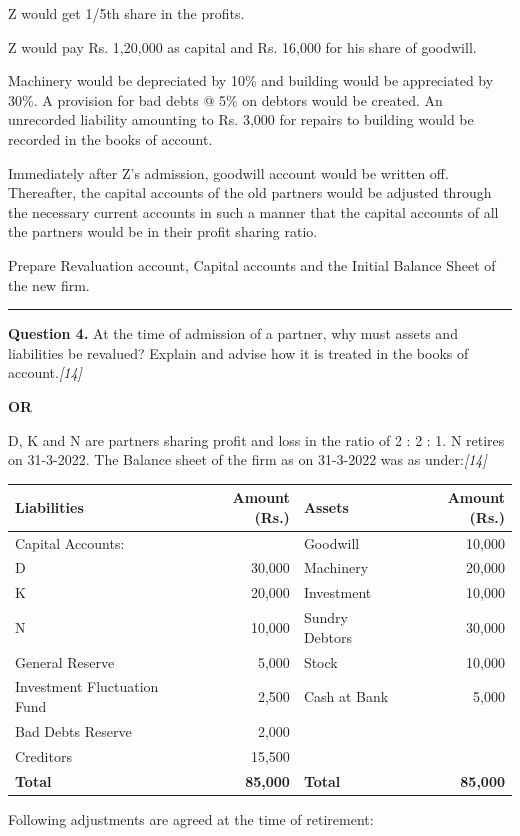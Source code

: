 \documentclass[11pt,a4paper]{article}
\newcommand{\pts}[1]{\hfill   \textit{[#1]}}
\begin{document}
\begin{parts}
  \item Z would get 1/5th share in the profits.
  \item Z would pay Rs. 1,20,000 as capital and Rs. 16,000 for his share of goodwill.
  \item Machinery would be depreciated by 10\% and building would be appreciated by 30\%. A provision for bad debts @ 5\% on debtors would be created. An unrecorded liability amounting to Rs. 3,000 for repairs to building would be recorded in the books of account.
  \item Immediately after Z's admission, goodwill account would be written off. Thereafter, the capital accounts of the old partners would be adjusted through the necessary current accounts in such a manner that the capital accounts of all the partners would be in their profit sharing ratio.
\end{parts}
Prepare Revaluation account, Capital accounts and the Initial Balance Sheet of the new firm.

\medskip\rule{\linewidth}{0.2pt}


\newpage




\noindent   \textbf{Question 4.}
At the time of admission of a partner, why must assets and liabilities be revalued? Explain and advise how it is treated in the books of account.\pts{14}

\centerline{   \textbf{OR}}

D, K and N are partners sharing profit and loss in the ratio of 2 : 2 : 1. N retires on 31-3-2022. The Balance sheet of the firm as on 31-3-2022 was as under:\pts{14}

\begin{center}
  \small
  
\begin{tabular}{|l|r||l|r|}
    \hline
   \textbf{Liabilities} &   \textbf{Amount (Rs.)} &   \textbf{Assets} &   \textbf{Amount (Rs.)} \\
    \hline
    Capital Accounts: & & Goodwill & 10,000 \\
    \quad D & 30,000 & Machinery & 20,000 \\
    \quad K & 20,000 & Investment & 10,000 \\
    \quad N & 10,000 & Sundry Debtors & 30,000 \\
    General Reserve & 5,000 & Stock & 10,000 \\
    Investment Fluctuation Fund & 2,500 & Cash at Bank & 5,000 \\
    Bad Debts Reserve & 2,000 & & \\
    Creditors & 15,500 & & \\
    \hline
   \textbf{Total} &   \textbf{85,000} &   \textbf{Total} &   \textbf{85,000} \\
    \hline
  \end{tabular}
\end{center}
Following adjustments are agreed at the time of retirement:
\end{document}
